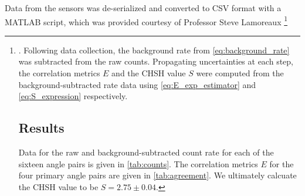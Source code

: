 \documentclass[letter,scriptaddress,twocolumn, prl, nofootinbib]{revtex4}
\begin{document}
Data from the sensors was de-serialized and converted to CSV format with a MATLAB script, which was provided courtesy of Professor Steve Lamoreaux \cite{luengo_andres-luengoalden-andres-max-most-dangerous-4450-trio_2026}\footnote{. Following data collection, the background rate from \autoref{eq:background_rate} was subtracted from the raw counts. Propagating uncertainties at each step, the correlation metrics $E$ and the CHSH value $S$ were computed from the background-subtracted rate data using \autoref{eq:E_exp_estimator} and \autoref{eq:S_expression} respectively.

\section{Results}\label{sec:results}

Data for the raw and background-subtracted count rate for each of the sixteen angle pairs is given in \autoref{tab:counts}. The correlation metrics $E$ for the four primary angle pairs are given in \autoref{tab:agreement}. We ultimately calcuate the CHSH value to be $S=2.75 \pm 0.04$.

}
\end{document}
